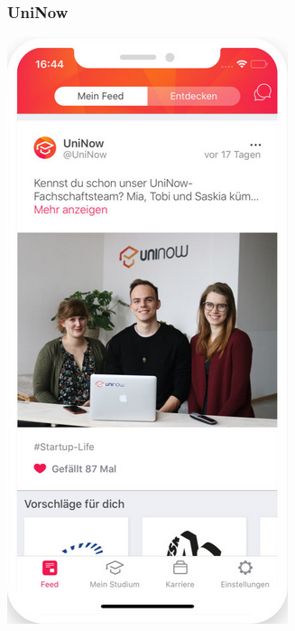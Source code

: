 \documentclass[10pt,a4paper]{beamer}
\begin{document}
    \begin{frame}
        \frametitle{UniNow}
        \begin{center}
            \includegraphics[height=0.7\textheight]{uninow1.png}
            \hspace{1cm}

\end{center}
\end{frame}
\end{document}
